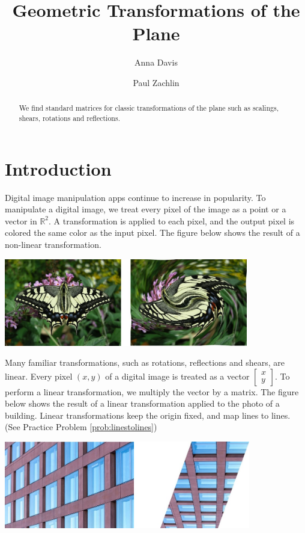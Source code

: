 \documentclass{ximera}
\author{Anna Davis \and Paul Zachlin} \title{Geometric Transformations of the Plane} \license{CC-BY 4.0}
\newcommand{\RR}{\mathbb{R}}
\begin{document}
\begin{abstract}
  We find standard matrices for classic transformations of the plane such as scalings, shears, rotations and reflections.
\end{abstract}
\maketitle

\section*{Introduction}
Digital image manipulation apps continue to increase in popularity.  To manipulate a digital image, we treat every pixel of the image as a point or a vector in $\RR^2$.  A transformation is applied to each pixel, and the output pixel is colored the same color as the input pixel.  The figure below shows the result of a non-linear transformation.

\begin{image}
   
\includegraphics[height=1.5in]{twobutterflies.jpg}~
 
\end{image}

Many familiar transformations, such as rotations, reflections and shears, are linear. Every pixel $(x, y)$ of a digital image is treated as a vector $\begin{bmatrix}
x\\
y
\end{bmatrix}$.  To perform a linear transformation, we multiply the vector by a matrix.  The figure below shows the result of a linear transformation applied to the photo of a building.  Linear transformations keep the origin fixed, and map lines to lines. (See Practice Problem \ref{prob:linestolines})  


    \begin{image}
         \includegraphics[height=1.5in]{twobuildings.jpg}
\end{image}
\end{document}
